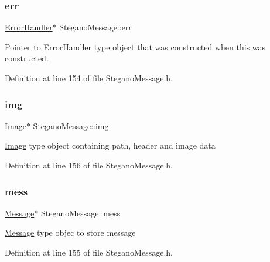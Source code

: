 \subsubsection{\texorpdfstring{err}{err}}
{\footnotesize\ttfamily \mbox{\hyperlink{classErrorHandler}{Error\+Handler}}$\ast$ Stegano\+Message\+::err\hspace{0.3cm}{\ttfamily [private]}}

Pointer to \mbox{\hyperlink{classErrorHandler}{Error\+Handler}} type object that was constructed when this was constructed. 

Definition at line 154 of file Stegano\+Message.\+h.

\mbox{\label{classSteganoMessage_acd7dba217d5df515d93ddf814734ecf4}} 
\subsubsection{\texorpdfstring{img}{img}}
{\footnotesize\ttfamily \mbox{\hyperlink{classImage}{Image}}$\ast$ Stegano\+Message\+::img\hspace{0.3cm}{\ttfamily [private]}}

\mbox{\hyperlink{classImage}{Image}} type object containing path, header and image data 

Definition at line 156 of file Stegano\+Message.\+h.

\mbox{\label{classSteganoMessage_a64f70bbacb0662cebe764316658da35d}} 
\subsubsection{\texorpdfstring{mess}{mess}}
{\footnotesize\ttfamily \mbox{\hyperlink{classMessage}{Message}}$\ast$ Stegano\+Message\+::mess\hspace{0.3cm}{\ttfamily [private]}}

\mbox{\hyperlink{classMessage}{Message}} type objec to store message 

Definition at line 155 of file Stegano\+Message.\+h.

\mbox{\label{classSteganoMessage_a8772194b7823da730648f8d4c06334a8}} 

